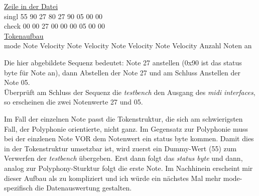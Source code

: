 \underline{Zeile in der Datei}\\
singl \hspace*{3mm} 55 \hspace*{4mm} 90 \hspace*{12mm}  27 \hspace*{6mm} 80 \hspace*{10mm} 27 \hspace*{6mm} 90 \hspace*{10mm} 05 \hspace*{6mm} 00 \hspace*{12mm} 00\\
check \hspace*{2mm} 00 \hspace*{4mm} 00 \hspace*{12mm}  27 \hspace*{6mm} 00 \hspace*{10mm} 00 \hspace*{6mm} 00 \hspace*{10mm} 05 \hspace*{6mm} 00 \hspace*{12mm} 00\\

\underline{Tokenaufbau}\\
mode	\hspace{2mm} Note \hspace*{2mm} 	Velocity	\hspace*{2mm} Note \hspace*{2mm}  Velocity \hspace*{2mm} 	Note \hspace*{2mm} 	Velocity \hspace*{2mm} 	Note \hspace*{2mm} 	Velocity \hspace*{2mm}  Anzahl Noten an

Die hier abgebildete Sequenz bedeutet: Note 27 anstellen (0x90 ist das status byte für Note an), dann Abstellen der Note 27 und am Schluss Anstellen der Note 05. \\
Überprüft am Schluss der Sequenz die \textit{testbench} den Ausgang des \textit{midi interfaces}, so erscheinen die zwei Notenwerte 27 und 05.

Im Fall der einzelnen Note passt die Tokenstruktur, die sich am schwierigsten Fall, der Polyphonie orientierte, nicht ganz. Im Gegensatz zur Polyphonie muss bei der einzlenen Note VOR dem Notenwert ein status byte kommen. Damit dies in der Tokenstruktur umsetzbar ist, wird zuerst ein Dummy-Wert (55) zum Verwerfen der \textit{testbench} übergeben. Erst dann folgt das \textit{status byte} und dann, analog zur Polyphony-Sturktur folgt die erste Note. Im Nachhinein erscheint mir dieser Aufbau als zu kompliziert und ich würde ein nächstes Mal mehr mode-spezifisch die Datenauswertung gestalten.




